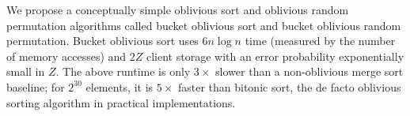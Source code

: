 We propose a conceptually simple oblivious sort and oblivious random permutation algorithms called bucket oblivious sort and bucket oblivious random permutation.
Bucket oblivious sort uses $6n\log n$ time (measured by the number of memory accesses) and $2Z$ client storage with an error probability exponentially small in $Z$. 
The above runtime is only $3\times$ slower than a non-oblivious merge sort baseline;
for $2^{30}$ elements, it is $5\times$ faster than bitonic sort,
the de facto oblivious sorting algorithm in practical implementations. 


